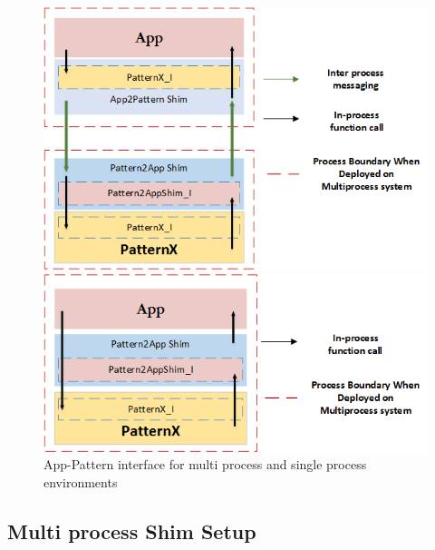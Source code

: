 \begin{figure}[ht]
\centering
	  \begin{minipage}[b]{0.4\textwidth}
	    \includegraphics[width=\textwidth]{figures/App_Pattern_ShimArchitectureMP}
	  \end{minipage}
	  \hspace{5mm}
	  \begin{minipage}[b]{0.4\textwidth}
	    \includegraphics[width=\textwidth]{figures/App_Pattern_ShimArchitectureSP}
	  \end{minipage}
\caption{App-Pattern interface for multi process and single process environments}
\label{fig:AppPatternInterface}
\end{figure}


\subsection{Multi process Shim Setup}

